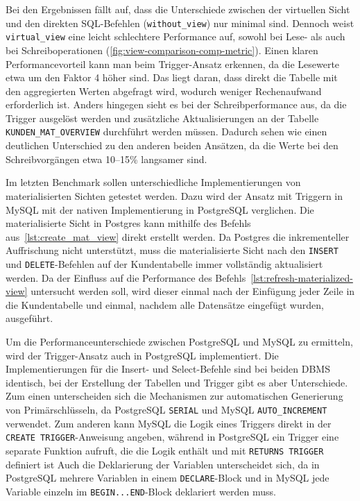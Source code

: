 Bei den Ergebnissen fällt auf, dass die Unterschiede zwischen der virtuellen Sicht und den direkten SQL-Befehlen (\texttt{without\_view}) nur minimal sind.
Dennoch weist \texttt{virtual\_view} eine leicht schlechtere Performance auf, sowohl bei Lese- als auch bei Schreiboperationen (\ref{fig:view-comparison-comp-metric}).
Einen klaren Performancevorteil kann man beim Trigger-Ansatz erkennen, da die Lesewerte etwa um den Faktor 4 höher sind.
Das liegt daran, dass direkt die Tabelle mit den aggregierten Werten abgefragt wird, wodurch weniger Rechenaufwand erforderlich ist.
Anders hingegen sieht es bei der Schreibperformance aus, da die Trigger ausgelöst werden und zusätzliche Aktualisierungen an der Tabelle \texttt{KUNDEN\_MAT\_OVERVIEW} durchführt werden müssen.
Dadurch sehen wie einen deutlichen Unterschied zu den anderen beiden Ansätzen, da die Werte bei den Schreibvorgängen etwa 10--15\% langsamer sind.

Im letzten Benchmark sollen unterschiedliche Implementierungen von materialisierten Sichten getestet werden.
Dazu wird der Ansatz mit Triggern in MySQL mit der nativen Implementierung in PostgreSQL verglichen.
Die materialisierte Sicht in Postgres kann mithilfe des Befehls aus~\ref{lst:create_mat_view} direkt erstellt werden.
Da Postgres die inkrementeller Auffrischung nicht unterstützt, muss die materialisierte Sicht nach den \texttt{INSERT} und \texttt{DELETE}-Befehlen auf der Kundentabelle immer vollständig aktualisiert werden.
Da der Einfluss auf die Performance des Befehls~\ref{lst:refresh-materialized-view} untersucht werden soll, wird dieser einmal nach der Einfügung jeder Zeile in die Kundentabelle und einmal, nachdem alle Datensätze eingefügt wurden, ausgeführt.

Um die Performanceunterschiede zwischen PostgreSQL und MySQL zu ermitteln, wird der Trigger-Ansatz auch in PostgreSQL implementiert.
Die Implementierungen für die Insert- und Select-Befehle sind bei beiden DBMS identisch, bei der Erstellung der Tabellen und Trigger gibt es aber Unterschiede.
Zum einen unterscheiden sich die Mechanismen zur automatischen Generierung von Primärschlüsseln, da PostgreSQL \texttt{SERIAL} und MySQL \texttt{AUTO\_INCREMENT} verwendet.
Zum anderen kann MySQL die Logik eines Triggers direkt in der \texttt{CREATE TRIGGER}-Anweisung angeben, während in PostgreSQL ein Trigger eine separate Funktion aufruft, die die Logik enthält und mit \texttt{RETURNS TRIGGER} definiert ist
Auch die Deklarierung der Variablen unterscheidet sich, da in PostgreSQL mehrere Variablen in einem \texttt{DECLARE}-Block und in MySQL jede Variable einzeln im \texttt{BEGIN...END}-Block deklariert werden muss.

